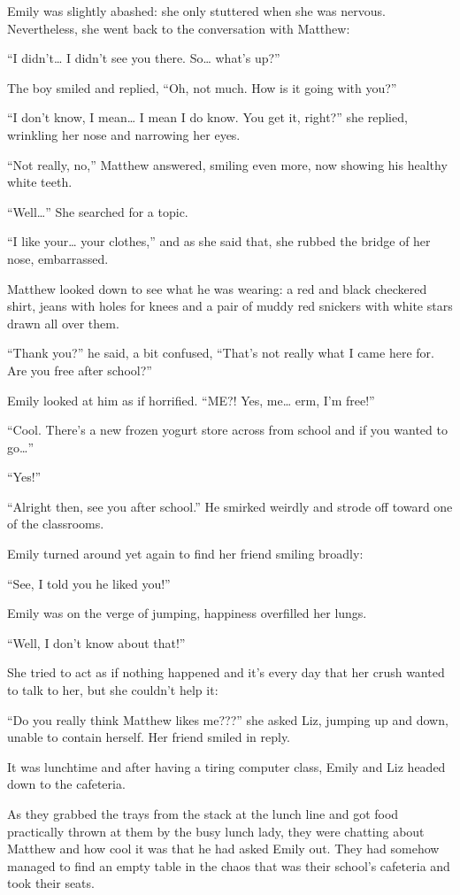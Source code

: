 Emily was slightly abashed: she only stuttered when she was nervous. Nevertheless, she went back to the conversation with Matthew:

“I didn’t… I didn’t see you there. So… what’s up?”

The boy smiled and replied, “Oh, not much. How is it going with you?”

“I don’t know, I mean… I mean I do know. You get it, right?” she replied, wrinkling her nose and narrowing her eyes.

“Not really, no,” Matthew answered, smiling even more, now showing his healthy white teeth.

“Well…” She searched for a topic.

“I like your… your clothes,” and as she said that, she rubbed the bridge of her nose, embarrassed.

Matthew looked down to see what he was wearing: a red and black checkered shirt, jeans with holes for knees and a pair of muddy red snickers with white stars drawn all over them.

“Thank you?” he said, a bit confused, “That’s not really what I came here for. Are you free after school?”

Emily looked at him as if horrified. “ME?! Yes, me… erm, I’m free!”

“Cool. There’s a new frozen yogurt store across from school and if you wanted to go…”

“Yes!”

“Alright then, see you after school.” He smirked weirdly and strode off toward one of the classrooms.

Emily turned around yet again to find her friend smiling broadly:

“See, I told you he liked you!”

Emily was on the verge of jumping, happiness overfilled her lungs.

“Well, I don’t know about that!”

She tried to act as if nothing happened and it’s every day that her crush wanted to talk to her, but she couldn’t help it:

“Do you really think Matthew likes me???” she asked Liz, jumping up and down, unable to contain herself. Her friend smiled in reply.

\bigskip

It was lunchtime and after having a tiring computer class, Emily and Liz headed down to the cafeteria.

As they grabbed the trays from the stack at the lunch line and got food practically thrown at them by the busy lunch lady, they were chatting about Matthew and how cool it was that he had asked Emily out.
They had somehow managed to find an empty table in the chaos that was their school’s cafeteria and took their seats.

